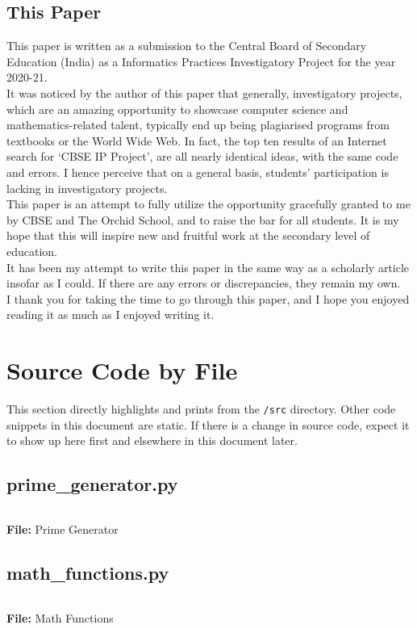 \documentclass{article}
\newenvironment{longlisting}{\captionsetup{type=listing}}{}
\begin{document}
\subsection{This Paper}
This paper is written as a submission to the Central Board of Secondary Education (India) as a
Informatics Practices Investigatory Project for the year 2020-21. \\
It was noticed by the author of this paper that generally, investigatory projects, which are an
amazing opportunity to showcase computer science and mathematics-related talent, typically end up being
plagiarised programs from textbooks or the World Wide Web. In fact, the top ten results of an
Internet search for `CBSE IP Project', are all nearly identical ideas, with the same code and
errors. I hence perceive that on a general basis, students' participation is lacking in
investigatory projects.\\
This paper is an attempt to fully utilize the opportunity gracefully granted to me by CBSE and The
Orchid School, and to raise the bar for all students. It is my hope that this will inspire new and
fruitful work at the secondary level of education.\\
It has been my attempt to write this paper in the same way as a scholarly article insofar as I
could. If there are any errors or discrepancies, they remain my own.\\
I thank you for taking the time to go through this paper, and I hope you enjoyed reading it as much
as I enjoyed writing it.\\

\newpage

\section{Source Code by File}
This section directly highlights and prints from the \texttt{/src} directory. Other code snippets in
this document are static. If there is a change in source code, expect it to show up here first and
elsewhere in this document later.

\subsection{prime\_generator.py}
\begin{longlisting}
\inputminted{python}{../src/prime_generator.py}
\caption{\textbf{File:} Prime Generator}
\end{longlisting}


\subsection{math\_functions.py}
\begin{longlisting}
\inputminted{python}{../src/math_functions.py}
\caption{\textbf{File:} Math Functions}
\end{longlisting}
\end{document}

